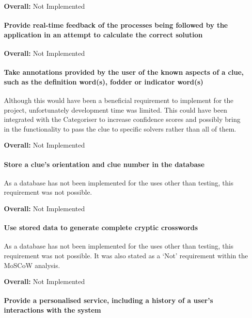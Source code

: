 {\bf Overall:} Not Implemented


\paragraph{Provide real-time feedback of the processes being followed by the
application in an attempt to calculate the correct solution}

{\bf Overall:} Not Implemented


\paragraph{Take annotations provided by the user of the known aspects of a clue,
such as the definition word(s), fodder or indicator word(s)}

Although this would have been a beneficial requirement to implement for the
project, unfortunately development time was limited. This could have been
integrated with the Categoriser to increase confidence scores and possibly
bring in the functionality to pass the clue to specific solvers rather than all
of them.

{\bf Overall:} Not Implemented


\paragraph{Store a clue's orientation and clue number in the database}

As a database has not been implemented for the uses other than testing, this
requirement was not possible.

{\bf Overall:} Not Implemented


\paragraph{Use stored data to generate complete cryptic crosswords}

As a database has not been implemented for the uses other than testing,  this
requirement was not possible. It was also stated as a `Not' requirement  within
the MoSCoW analysis.

{\bf Overall:} Not Implemented


\paragraph{Provide a personalised service, including a history of a user's
interactions with the system}

